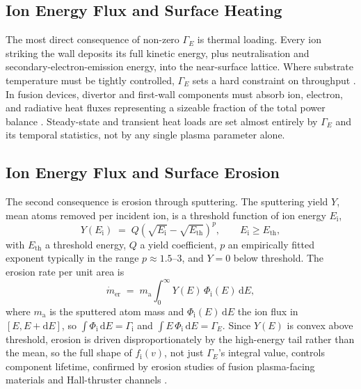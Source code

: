 \subsection{Ion Energy Flux and Surface Heating}

The most direct consequence of non-zero $\Gamma_E$ is thermal loading. Every ion striking the wall deposits its full kinetic energy, plus neutralisation and secondary-electron-emission energy, into the near-surface lattice. Where substrate temperature must be tightly controlled, $\Gamma_E$ sets a hard constraint on throughput \cite{ref0080}. In fusion devices, divertor and first-wall components must absorb ion, electron, and radiative heat fluxes representing a sizeable fraction of the total power balance \cite{ref0093}. Steady-state and transient heat loads are set almost entirely by $\Gamma_E$ and its temporal statistics, not by any single plasma parameter alone.

\subsection{Ion Energy Flux and Surface Erosion}

The second consequence is erosion through sputtering. The sputtering yield $Y$, mean atoms removed per incident ion, is a threshold function of ion energy $E_{\mathrm{i}}$,
\begin{equation}
Y(E_{\mathrm{i}}) \;=\; Q \left(\sqrt{E_{\mathrm{i}}} - \sqrt{E_{\mathrm{th}}}\right)^{p}, \qquad E_{\mathrm{i}} \ge E_{\mathrm{th}},
\label{eq:sputter-yield}
\end{equation}
with $E_{\mathrm{th}}$ a threshold energy, $Q$ a yield coefficient, $p$ an empirically fitted exponent typically in the range $p \approx 1.5$--$3$, and $Y=0$ below threshold. The erosion rate per unit area is
\begin{equation}
\dot{m}_{\mathrm{er}} \;=\; m_{\mathrm{a}} \int_{0}^{\infty} Y(E)\, \Phi_{\mathrm{i}}(E)\,\mathrm{d}E,
\label{ch01-eq:erosion-rate}
\end{equation}
where $m_{\mathrm{a}}$ is the sputtered atom mass and $\Phi_{\mathrm{i}}(E)\,\mathrm{d}E$ the ion flux in $[E, E+\mathrm{d}E]$, so $\int \Phi_{\mathrm{i}}\,\mathrm{d}E = \Gamma_{\mathrm{i}}$ and $\int E\,\Phi_{\mathrm{i}}\,\mathrm{d}E = \Gamma_{E}$. Since $Y(E)$ is convex above threshold, erosion is driven disproportionately by the high-energy tail rather than the mean, so the full shape of $f_{\mathrm{i}}(v)$, not just $\Gamma_E$'s integral value, controls component lifetime, confirmed by erosion studies of fusion plasma-facing materials \cite{ref0189,ref0190} and Hall-thruster channels \cite{ref0440}.

